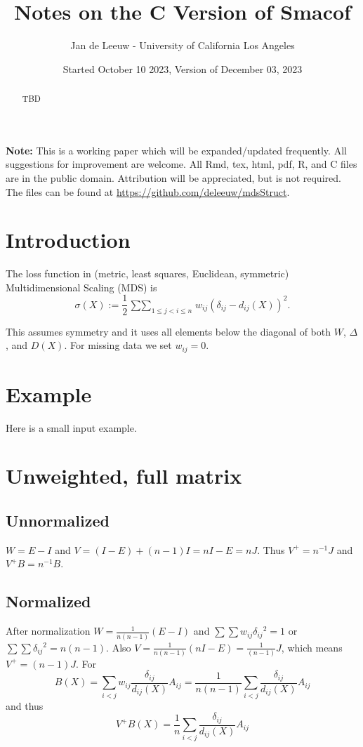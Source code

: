 \documentclass[
  12pt,
]{article}
\title{Notes on the C Version of Smacof}
\author{Jan de Leeuw - University of California Los Angeles}
\date{Started October 10 2023, Version of December 03, 2023}
\newcommand{\jis}{\mathop{\sum\sum}_{1\leq j<i\leq n}}
\begin{document}
\maketitle
\begin{abstract}
TBD
\end{abstract}

{
\setcounter{tocdepth}{4}
\tableofcontents
}
\textbf{Note:} This is a working paper which will be expanded/updated frequently. All suggestions for improvement are welcome. All Rmd, tex, html, pdf, R, and C files are in the public domain. Attribution
will be appreciated, but is not required. The files can be found at
\url{https://github.com/deleeuw/mdsStruct}.

\section{Introduction}\label{introduction}

The loss function in (metric, least squares, Euclidean, symmetric) Multidimensional Scaling (MDS)
is
\[
\sigma(X):=\frac12\jis w_{ij}(\delta_{ij}-d_{ij}(X))^2.
\]

This assumes symmetry and it uses all elements below the diagonal of both \(W\), \(\Delta\), and \(D(X)\).
For missing data we set \(w_{ij}=0\).

\section{Example}\label{example}

Here is a small input example.

\section{Unweighted, full matrix}\label{unweighted-full-matrix}

\subsection{Unnormalized}\label{unnormalized}

\(W=E-I\) and \(V=(I-E)+(n-1)I=nI-E=nJ\). Thus \(V^+=n^{-1}J\) and \(V^+B=n^{-1}B\).

\subsection{Normalized}\label{normalized}

After normalization \(W=\frac{1}{n(n-1)}(E-I)\) and \(\sum\sum w_{ij}\delta_{ij}{^2}=1\)
or \(\sum\sum\delta_{ij}{^2}=n(n-1)\). Also \(V=\frac{1}{n(n-1)}(nI-E)=\frac{1}{(n-1)}J\), which means \(V^+=(n-1)J\). For
\[
B(X)=\sum_{i<j}w_{ij}\frac{\delta_{ij}}{d_{ij}(X)}A_{ij}=\frac{1}{n(n-1)}\sum_{i<j}\frac{\delta_{ij}}{d_{ij}(X)}A_{ij}
\]
and thus
\[
V^+B(X)=\frac{1}{n}\sum_{i<j}\frac{\delta_{ij}}{d_{ij}(X)}A_{ij}
\]
\end{document}
